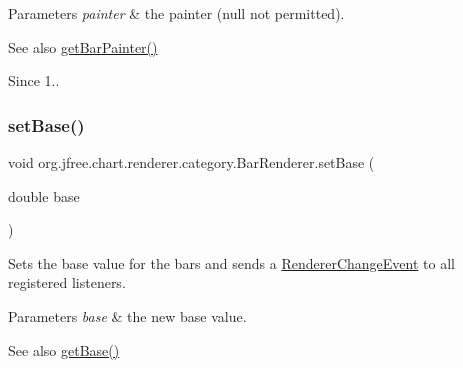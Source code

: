 \begin{DoxyParams}{Parameters}
{\em painter} & the painter ({\ttfamily null} not permitted).\\
\hline
\end{DoxyParams}
\begin{DoxySeeAlso}{See also}
\mbox{\hyperlink{classorg_1_1jfree_1_1chart_1_1renderer_1_1category_1_1_bar_renderer_ae011f2b42d968c51c3928b7c3d2a9267}{get\+Bar\+Painter()}}
\end{DoxySeeAlso}
\begin{DoxySince}{Since}
1.. 
\end{DoxySince}
\mbox{\label{classorg_1_1jfree_1_1chart_1_1renderer_1_1category_1_1_bar_renderer_af998b6dafee9431ff2ec95422d0d5e4f}} 
\subsubsection{\texorpdfstring{set\+Base()}{setBase()}}
{\footnotesize\ttfamily void org.\+jfree.\+chart.\+renderer.\+category.\+Bar\+Renderer.\+set\+Base (\begin{DoxyParamCaption}\item[{double}]{base }\end{DoxyParamCaption})}

Sets the base value for the bars and sends a \mbox{\hyperlink{}{Renderer\+Change\+Event}} to all registered listeners.


\begin{DoxyParams}{Parameters}
{\em base} & the new base value.\\
\hline
\end{DoxyParams}
\begin{DoxySeeAlso}{See also}
\mbox{\hyperlink{classorg_1_1jfree_1_1chart_1_1renderer_1_1category_1_1_bar_renderer_ac6046a96ca5f1da74dc46393ad19a866}{get\+Base()}} 
\end{DoxySeeAlso}
\mbox{\label{classorg_1_1jfree_1_1chart_1_1renderer_1_1category_1_1_bar_renderer_aa5b8c4d29322deb81eaec4377c2dd2a6}} 
